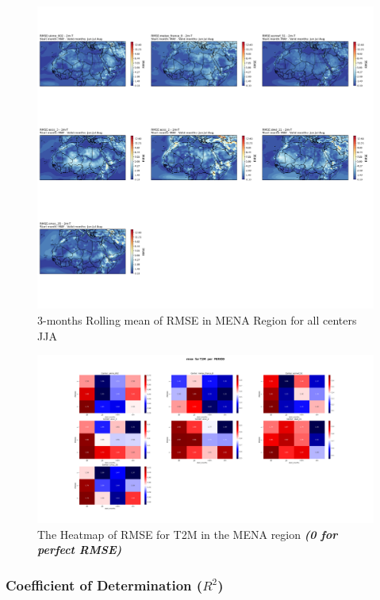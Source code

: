 \begin{figure}[H]
\includegraphics[scale=0.3]{RMSE_JJA.png}
\caption{3-months Rolling mean of RMSE in MENA Region for all centers JJA}
\end{figure}



\begin{figure}[H]
\includegraphics[scale=0.25]{rmse_T2M_ PERIOD.png}
\caption{The Heatmap of RMSE for T2M in the MENA region 
\textbf{\textit{(0 for perfect RMSE)} }}
\end{figure}






\subsubsection{Coefficient of Determination (\( R^2 \))}

